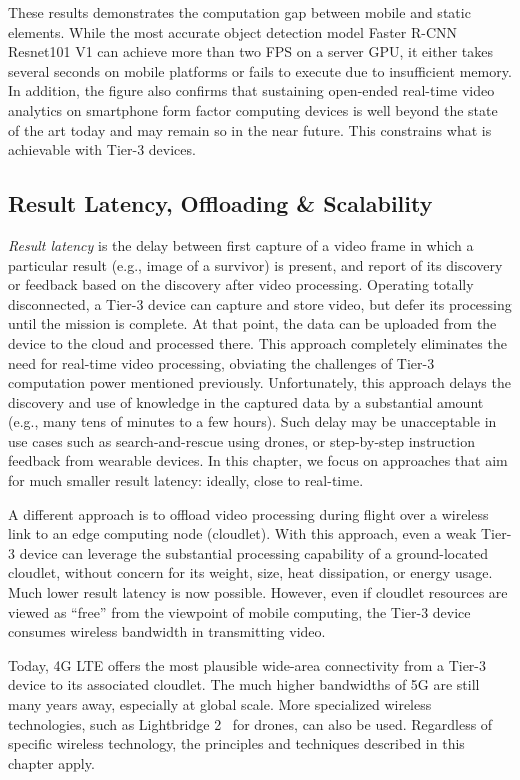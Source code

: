 These results demonstrates the computation gap between mobile and static
elements. While the most accurate object detection model Faster R-CNN Resnet101 V1
can achieve more than two FPS on a server GPU, it either takes several seconds
on  mobile platforms or fails to execute due to insufficient memory. In
addition, the figure also confirms that sustaining open-ended real-time video
analytics on smartphone form factor computing devices is well beyond the state
of the art today and may remain so in the near future.  This constrains what is
achievable with Tier-3 devices.

\subsection{Result Latency, Offloading \& Scalability}
\label{bw:offloading}

{\em Result latency} is the delay between first capture of a video frame in
which a particular result (e.g., image of a survivor) is present, and report of
its discovery or feedback based on the discovery after video processing.
Operating totally disconnected, a Tier-3 device can capture and store video, but
defer its processing until the mission is complete.  At that point, the data can
be uploaded from the device to the cloud and processed there.  This approach
completely eliminates the need for real-time video processing, obviating the
challenges of Tier-3 computation power mentioned previously. Unfortunately, this
approach delays the discovery and use of knowledge in the captured data by a
substantial amount (e.g., many tens of minutes to a few hours).  Such delay may
be unacceptable in use cases such as search-and-rescue using drones, or
step-by-step instruction feedback from wearable devices. In this chapter, we focus
on approaches that aim for much smaller result latency: ideally, close to
real-time.

A different approach is to offload video processing during flight over a
wireless link to an edge computing node (cloudlet). With this approach, even a
weak Tier-3 device can leverage the substantial processing capability of a
ground-located cloudlet, without concern for its weight, size, heat dissipation,
or energy usage.  Much lower result latency is now possible.  However, even if
cloudlet resources are viewed as ``free'' from the viewpoint of mobile
computing, the Tier-3 device consumes wireless bandwidth in transmitting video.

Today, 4G LTE offers the most plausible wide-area connectivity from a Tier-3
device to its associated cloudlet.  The much higher bandwidths of 5G are still
many years away, especially at global scale.  More specialized wireless
technologies, such as Lightbridge 2~\cite{LightBridge2} for drones, can also be
used.  Regardless of specific wireless technology, the principles and techniques
described in this chapter apply.

